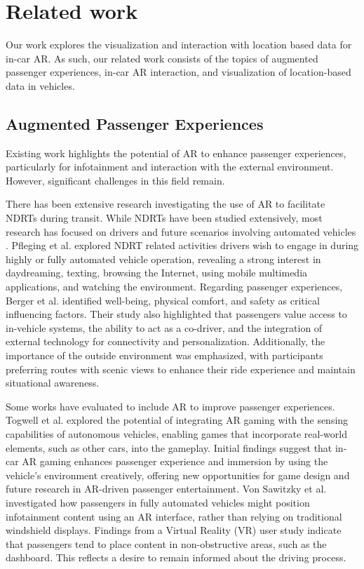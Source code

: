 \section{Related work}
\label{section:related}
Our work explores the visualization and interaction with location based data for in-car AR. As such, our related work consists of the topics of augmented passenger experiences, in-car AR interaction, and visualization of location-based data in vehicles.


\subsection{Augmented Passenger Experiences}
Existing work highlights the potential of AR to enhance passenger experiences, particularly for infotainment and interaction with the external environment. However, significant challenges in this field remain.

There has been extensive research investigating the use of AR to facilitate NDRTs during transit. While NDRTs have been studied extensively, most research has focused on drivers and future scenarios involving automated vehicles \cite{Pfleging16NDRNeeds}. Pfleging et al. \cite{Pfleging16NDRNeeds} explored NDRT related activities drivers wish to engage in during highly or fully automated vehicle operation,  revealing a strong interest in daydreaming, texting, browsing the Internet, using mobile multimedia applications, and watching the environment. Regarding passenger experiences, Berger et al. \cite{BergerGridStudyInCarPassenger2021} identified well-being, physical comfort, and safety as critical influencing factors. Their study also highlighted that passengers value access to in-vehicle systems, the ability to act as a co-driver, and the integration of external technology for connectivity and personalization. Additionally, the importance of the outside environment was emphasized, with participants preferring routes with scenic views to enhance their ride experience and maintain situational awareness.

Some works have evaluated to include AR to improve passenger experiences. Togwell et al. \cite{Togwell2022gaming} explored the potential of integrating AR gaming with the sensing capabilities of autonomous vehicles, enabling games that incorporate real-world elements, such as other cars, into the gameplay. Initial findings suggest that in-car AR gaming enhances passenger experience and immersion by using the vehicle's environment creatively, offering new opportunities for game design and future research in AR-driven passenger entertainment. Von Sawitzky et al. \cite{Sawitzky23ArPlacement} investigated how passengers in fully automated vehicles might position infotainment content using an AR interface, rather than relying on traditional windshield displays. Findings from a Virtual Reality (VR) user study indicate that passengers tend to place content in non-obstructive areas, such as the dashboard. This reflects a desire to remain informed about the driving process.

